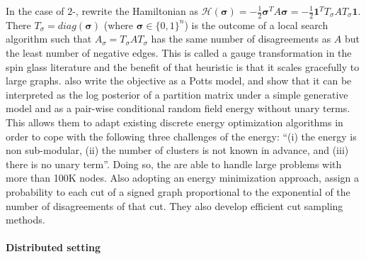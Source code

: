 In the case of $2$-\pcc{}, \textcite{Facchetti2011isingmodel} rewrite the Hamiltonian as
$\mathcal{H}(\bm{\sigma}) = -\frac{1}{2}\bm{\sigma}^T A \bm{\sigma} = -\frac{1}{2}\bm{1}^TT_\sigma A
T_\sigma\bm{1}$. There $T_\sigma = diag(\bm{\sigma})$ (where $\bm{\sigma} \in \{0,1\}^n$) is the
outcome of a local search algorithm such that $A_\sigma = T_\sigma A T_\sigma$ has the same number
of disagreements as $A$ but the least number of negative edges. This is called a gauge
transformation in the spin glass literature and the benefit of that heuristic is that it scales
gracefully to large graphs.
\Textcite{Bagon2011} also write the \maxa{} objective as a Potts model, and show that it can be
interpreted as the log posterior of a partition matrix under a simple generative model and as a
pair-wise conditional random field energy without unary terms. This allows them to adapt existing
discrete energy optimization algorithms in order to cope with the following three challenges of the
\pcc{} energy: \enquote{(i) the energy is non sub-modular, (ii) the number of clusters is not known
in advance, and (iii) there is no unary term}. Doing so, the are able to handle large problems with
more than 100K nodes.  Also adopting an energy minimization approach, \textcite{Kappes2016} assign a
probability to each cut of a signed graph proportional to the exponential of the number of
disagreements of that cut. They also develop efficient cut sampling methods.


\paragraph{Distributed setting}

